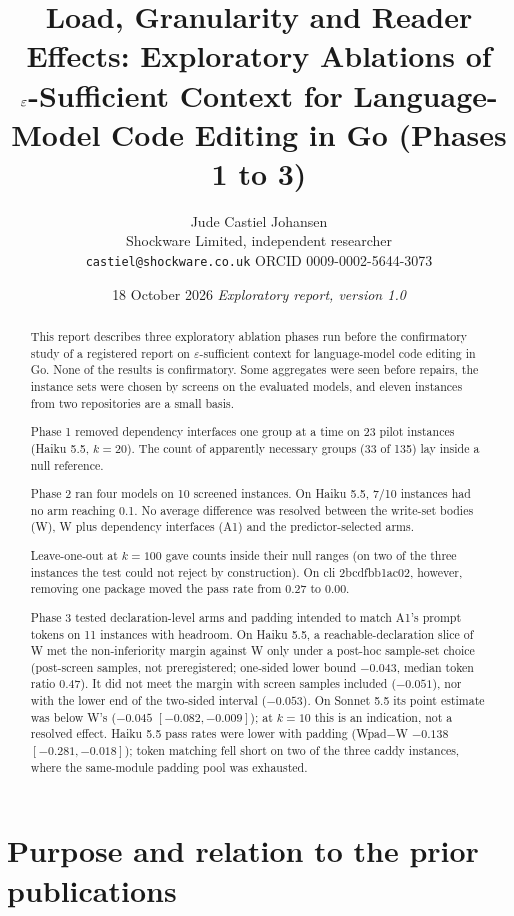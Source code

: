 \documentclass[10pt]{article}
\title{Load, Granularity and Reader Effects: Exploratory Ablations of\\ $\eps$-Sufficient Context for Language-Model Code Editing in Go (Phases 1 to 3)}
\author{Jude Castiel Johansen\\ Shockware Limited, independent researcher\\ \texttt{castiel@shockware.co.uk} \quad ORCID 0009-0002-5644-3073}
\date{18 October 2026 \quad\textit{Exploratory report, version 1.0}}
\newcommand{\eps}{\varepsilon}
\begin{document}
\maketitle

\begin{abstract}
This report describes three exploratory ablation phases run before the confirmatory study of a registered report on $\eps$-sufficient context for language-model code editing in Go. None of the results is confirmatory. Some aggregates were seen before repairs, the instance sets were chosen by screens on the evaluated models, and eleven instances from two repositories are a small basis.

Phase 1 removed dependency interfaces one group at a time on 23 pilot instances (Haiku 5.5, $k=20$). The count of apparently necessary groups (33 of 135) lay inside a null reference.

Phase 2 ran four models on 10 screened instances. On Haiku 5.5, 7/10 instances had no arm reaching 0.1. No average difference was resolved between the write-set bodies (W), W plus dependency interfaces (A1) and the predictor-selected arms.

Leave-one-out at $k=100$ gave counts inside their null ranges (on two of the three instances the test could not reject by construction). On cli 2bcdfbb1ac02, however, removing one package moved the pass rate from 0.27 to 0.00.

Phase 3 tested declaration-level arms and padding intended to match A1's prompt tokens on 11 instances with headroom. On Haiku 5.5, a reachable-declaration slice of W met the non-inferiority margin against W only under a post-hoc sample-set choice (post-screen samples, not preregistered; one-sided lower bound $-0.043$, median token ratio 0.47). It did not meet the margin with screen samples included ($-0.051$), nor with the lower end of the two-sided interval ($-0.053$). On Sonnet 5.5 its point estimate was below W's ($-0.045$ $[-0.082, -0.009]$); at $k=10$ this is an indication, not a resolved effect. Haiku 5.5 pass rates were lower with padding (Wpad$-$W $-0.138$ $[-0.281, -0.018]$); token matching fell short on two of the three caddy instances, where the same-module padding pool was exhausted.
\end{abstract}

\section{Purpose and relation to the prior publications}
\end{document}
